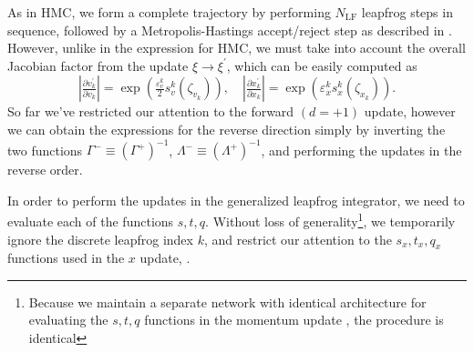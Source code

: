 \documentclass{article} %
\begin{document}
{As in HMC, we form a complete trajectory by performing \(N_{\mathrm{LF}}\) leapfrog steps in sequence, followed by a
Metropolis-Hastings accept/reject step as described in .
%
However, unlike in the expression for HMC, we must take into account the overall Jacobian factor from the update
\(\xi\rightarrow\xi^{\prime}\), which can be easily computed as 
%
\begin{equation}
   \left|\tfrac{\partial v^{\prime}_{k}}{\partial v_{k}}\right| 
   = \exp{\left(\tfrac{\varepsilon^{k}_{v}}{2}s^{k}_{v}(\zeta_{v_{k}})\right)},\quad
   \left|\tfrac{\partial x^{\prime}_{k}}{\partial x_{k}}\right| 
   = \exp{\left(\varepsilon^{k}_{x} s^{k}_{x}(\zeta_{x_{k}})\right)}.
\end{equation}
%
So far we've restricted our attention to the forward \((d=+1)\) update, however we can obtain the expressions for the
reverse direction simply by inverting the two functions \(\Gamma^{-}\equiv{\left(\Gamma^{+}\right)}^{-1}\),
\(\Lambda^{-}\equiv{\left(\Lambda^{+}\right)}^{-1}\), and performing the updates in the reverse order.

In order to perform the updates in the generalized leapfrog integrator, we need to evaluate each of the functions
\(s, t, q\).
%
%
Without loss of generality\footnote{Because we maintain a separate network with identical architecture for evaluating
the \(s, t, q\) functions in the momentum update , the procedure is identical},
we temporarily ignore the discrete leapfrog index \(k\), and restrict our attention to the
\(s_{x}, t_{x}, q_{x}\) functions used in the \(x\) update, .
%

}
\end{document}
